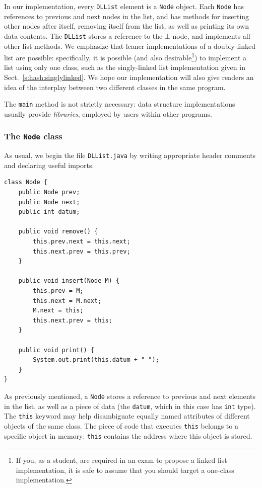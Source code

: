 \documentclass[a4paper]{book}
\theoremstyle{changebreak}                %
\begin{document}
In our implementation, every {\tt DLList} element is a {\tt Node}
object. Each {\tt Node} has references to
previous and next nodes in the
list, and has methods for inserting other nodes after itself, removing
itself from the list, as well as printing its own data contents. The
{\tt DLList} stores a reference to the $\bot$\index{$\bot$} node, and
implements all other list methods. We emphasize that leaner
implementations of a doubly-linked list are possible: specifically, it
is possible (and also desirable\footnote{If you, as a student, are
  required in an exam to propose a linked list implementation, it is
  safe to assume that you should target a one-class implementation.})
to implement a list using only one class, such as the singly-linked
list implementation given in
Sect.~\ref{s:hash:singlylinked}. We hope our implementation will also
give readers an idea of the interplay between two different classes in
the same program.

The {\tt main} method is not strictly necessary: data structure
implementations usually provide {\it libraries},
employed by users within other programs.

\subsubsection{The {{\tt Node}} class}
As usual, we begin the file {\tt DLList.java} by writing appropriate
header comments and declaring useful imports.
{\small
\begin{verbatim}
class Node {
    public Node prev;
    public Node next;
    public int datum;

    public void remove() {
        this.prev.next = this.next;
        this.next.prev = this.prev;
    }

    public void insert(Node M) {
        this.prev = M;
        this.next = M.next;
        M.next = this;
        this.next.prev = this;
    }

    public void print() {
        System.out.print(this.datum + " ");
    }
}
\end{verbatim}
} 

As previously mentioned, a {\tt Node} stores a
reference to previous and next elements in the list,
as well as a piece of data (the {\tt datum}, which in this case has
{\tt int} type). The {\tt this} keyword may help
disambiguate equally named attributes of different
objects of the same class. The piece of code that
executes {\tt this} belongs to a specific object in
memory: {\tt this} contains the address where
this object is stored.
\end{document}
